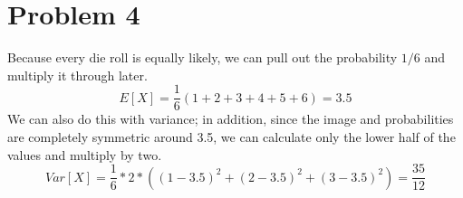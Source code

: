 \documentclass[11pt]{article}
\begin{document}
\section*{Problem 4}
Because every die roll is equally likely, we can pull out the probability $1/6$ and multiply it through later.
	\[E[X] = \dfrac{1}{6}( 1+2+3+4+5+6) = 3.5 \]
We can also do this with variance; in addition, since the image and probabilities are completely symmetric around 3.5, we can calculate only the lower half of the values and multiply by two.
	\[Var[X] = \dfrac{1}{6} * 2 * ( (1-3.5)^2 + (2 - 3.5)^2 + (3-3.5)^2 ) = \dfrac{35}{12} \]
	

	
	
\end{document}
